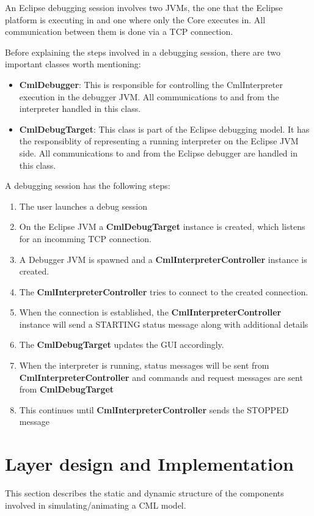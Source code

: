\documentclass[a4paper, 10pt]{include/compassreport}   %
\begin{document}
An Eclipse debugging session involves two JVMs, the one that the Eclipse
platform is executing in and one where only the Core executes in. All
communication between them is done via a TCP connection.

Before explaining the steps involved in a debugging session, there are
two important classes worth mentioning:

\begin{itemize}
\item \textbf{CmlDebugger}: This is responsible for
  controlling the CmlInterpreter execution in the debugger JVM.  All
  communications to and from the interpreter handled in this class.

\item \textbf{CmlDebugTarget}: This class is part of the Eclipse
  debugging model. It has the responsiblity of representing a running
  interpreter on the Eclipse JVM side. All communications to and from
  the Eclipse debugger are handled in this class.
\end{itemize}

A debugging session has the following steps:
\begin{enumerate}
\item The user launches a debug session
\item On the Eclipse JVM a \textbf{CmlDebugTarget} instance is
  created, which listens for an incomming TCP connection.
\item A Debugger JVM is spawned and a
  \textbf{CmlInterpreterController} instance is created.
\item The \textbf{CmlInterpreterController} tries to connect to the
  created connection.
\item When the connection is established, the
  \textbf{CmlInterpreterController} instance will send a STARTING status
  message along with additional details
\item The \textbf{CmlDebugTarget} updates the GUI accordingly.
\item When the interpreter is running, status messages will be sent from \textbf{CmlInterpreterController} and commands and request messages are sent from \textbf{CmlDebugTarget}
\item This continues until \textbf{CmlInterpreterController} sends the STOPPED message
\end{enumerate}


\section{Layer design and Implementation}
This section describes the static and dynamic structure of the
components involved in simulating/animating a CML model.
\end{document}
